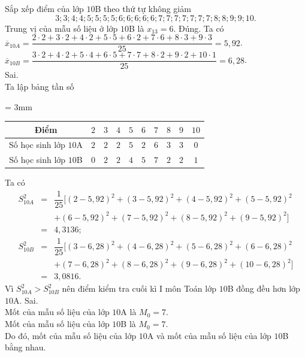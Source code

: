 \begin{ex}
{\begin{itemchoice}
			Sắp xếp điểm của lớp $10$B theo thứ tự không giảm
			$$3; 3; 4; 4; 5; 5; 5; 5; 6; 6; 6; 6; 6; 7; 7; 7; 7; 7; 7; 7; 8; 8; 9; 9; 10.$$
			Trung vị của mẫu số liệu ở lớp $10$B là $x_{13}=6$.
			\itemch Đúng.
			Ta có\\
			$\overline{x}_{10A} = \dfrac{2 \cdot 2 + 3 \cdot 2 + 4 \cdot 2 + 5 \cdot 5 + 6 \cdot 2 + 7 \cdot 6 + 8 \cdot 3 + 9 \cdot 3}{25} = 5{,}92$.\\
			$\overline{x}_{10B} = \dfrac{3 \cdot 2 + 4 \cdot 2 + 5 \cdot 4 + 6 \cdot 5 + 7 \cdot 7 + 8 \cdot 2 + 9 \cdot 2 + 10 \cdot 1}{25} = 6{,}28$.\\
			\itemch Sai.\\
			Ta lập bảng tần số\\
			{\tabcolsep = 3mm
				\begin{tabular}{|c|c|c|c|c|c|c|c|c|c|}
					\hline
					Điểm & $2$ & $3$ & $4$ & $5$ & $6$ & $7$ & $8$ & $9$ & $10$ \\
					\hline Số học sinh lớp $10$A & $2$ & $2$ & $2$ & $5$ & $2$ & $6$ & $3$ & $3$ & $0$\\
					\hline Số học sinh lớp $10$B & $0$ & $2$ & $2$ & $4$ & $5$ & $7$ & $2$ & $2$ & $1$  \\
					\hline
				\end{tabular}
			}
			
			Ta có
			\begin{eqnarray*}
				S^2_{10A} & = & \dfrac{1}{25} [ (2-5{,}92)^2 + (3-5{,}92)^2 +(4-5{,}92)^2 +(5-5{,}92)^2  \\
				& & +(6-5{,}92)^2 +(7-5{,}92)^2 +(8-5{,}92)^2 +(9-5{,}92)^2 ] \\
				& = & 4{,}3136;\\
				S^2_{10B} & = & \dfrac{1}{25} [ (3-6{,}28)^2 + (4-6{,}28)^2 + (5-6{,}28)^2 +(6-6{,}28)^2 \\
				& & + (7-6{,}28)^2 + (8-6{,}28)^2 +(9-6{,}28)^2 +(10-6{,}28)^2] \\
				& = & 3{,}0816.
			\end{eqnarray*}
			Vì $S^2_{10A} > S^2_{10B}$ nên điểm kiểm tra cuối kì I môn Toán lớp $10$B đồng đều hơn lớp $10$A.
			\itemch Sai.\\
			Mốt của mẫu số liệu của lớp $10$A là $M_0=7$.\\
			Mốt của mẫu số liệu của lớp $10$B là $M_0=7$.\\
			Do đó, mốt của mẫu số liệu của lớp $10$A và mốt của mẫu số liệu của lớp $10$B bằng nhau.
		\end{itemchoice}
		}
\end{ex}
